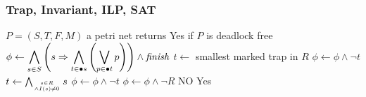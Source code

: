 \documentclass{beamer}
\theoremstyle{remark}
\theoremstyle{definition}
\newcommand{\pn}{Petri net}
\begin{document}
\begin{frame}
\frametitle{Trap, Invariant, ILP, SAT}
\begin{algorithm}[H]
{\tiny
\caption{Check \pn{} for deadlock freedom}
\label{algSafePN}
\begin{algorithmic}
\REQUIRE $P = (S,T,F,M)$ a petri net %
\ENSURE returns Yes if $P$ is deadlock free %
\STATE $\phi \leftarrow \displaystyle \bigwedge_{s \in S} \left( s \Rightarrow \bigwedge_{t \in \bullet s} \left(\bigvee_{p \in \bullet t} p \right) \right) \land \text{\emph{finish}}$
\STATE $t \leftarrow $ smallest marked trap in $R$
\STATE $\phi \leftarrow \phi \land \neg t$
\STATE $t \leftarrow \bigwedge_{s \in R \atop {\land I(s) \neq 0}} s$
\STATE $\phi \leftarrow \phi \land \neg t$
\STATE $\phi \leftarrow \phi \land \neg R$
\ELSE
\RETURN NO
\ENDIF
\ENDWHILE
\RETURN Yes
\end{algorithmic}
}
\end{algorithm}


\end{frame}
\end{document}
